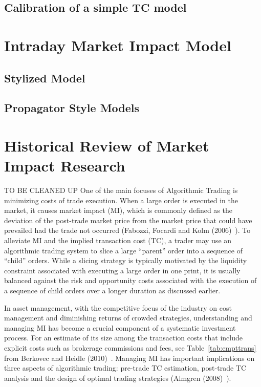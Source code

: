\subsection{Calibration of a simple TC model}

\section{Intraday Market Impact Model}

\subsection{Stylized Model}

\subsection{Propagator Style Models}

\section{Historical Review of Market Impact Research}
TO BE CLEANED UP
One of the main focuses of Algorithmic Trading is minimizing costs of trade execution. When a large order is executed in the market, it causes market impact (MI), which is commonly defined as the deviation of the post-trade market price from the market price that could have prevailed had the trade not occurred (Fabozzi, Focardi and Kolm (2006)~\cite{ffk}). To alleviate MI and the implied transaction cost (TC), a trader may use an algorithmic trading system to slice a large ``parent'' order into a sequence of ``child'' orders. While a slicing strategy is typically motivated by the liquidity constraint associated with executing a large order in one print, it is usually balanced against the risk and opportunity costs associated with the execution of a sequence of child orders over a longer duration as discussed earlier.


In asset management, with the competitive focus of the industry on cost management and diminishing returns of crowded strategies, understanding and managing MI has become a crucial component of a systematic investment process. For an estimate of its size among the transaction costs that include explicit costs such as brokerage commissions and fees, see Table~\ref{tab:empttrans} from Berkovec and Heidle (2010)~\cite{borkoheidle}. Managing MI has important implications on three aspects of algorithmic trading: pre-trade TC estimation, post-trade TC analysis and the design of optimal trading strategies (Almgren (2008)~\cite{alm2008}).

